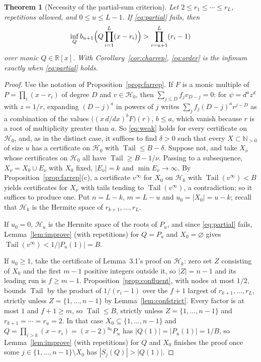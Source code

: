 \documentclass[11pt]{article}
\newtheorem{theorem}{Theorem}[section]
\theoremstyle{definition}
\theoremstyle{plain}
\newcommand{\R}{\mathbb R}
\newcommand{\N}{\mathbb N}
\DeclareMathOperator{\Tail}{Tail}
\begin{document}
\begin{theorem}[Necessity of the partial-sum criterion]\label{thm:converse}
Let $2\le r_1\le\cdots\le r_L$, repetitions allowed, and $0\le u\le L-1$.  If
\eqref{eq:partial} fails, then
\[
  \inf_Qb_{u+1}\Bigl(Q\prod_{i=1}^L(x-r_i)\Bigr)>\prod_{i=u+1}^L(r_i-1)
\]
over monic $Q\in\R[x]$.  With Corollary~\ref{cor:charrep},
\eqref{eq:order} is the infimum exactly when \eqref{eq:partial} holds.
\end{theorem}

\begin{proof}
Use the notation of Proposition~\ref{prop:farrep}.  If $F$ is a monic
multiple of $P=\prod_i(x-r_i)$ of degree $D$ and $v\in\mathcal H_0$, then
$\sum_{j\le D}f_jv_{D-j}=0$: for $\psi=d^az^d$ with $z=1/r$, expanding
$(D-j)^a$ in powers of $j$ writes $\sum_jf_j(D-j)^ar^{j-D}$ as a combination
of the values $\bigl((x\,d/dx)^bF\bigr)(r)$, $b\le a$, which vanish because
$r$ is a root of multiplicity greater than $a$.  So \eqref{eq:weak} holds
for every certificate on $\mathcal H_0$, and, as in the distinct case, it
suffices to find $\delta>0$ such that every $X\subset\N_{>0}$ of size $u$ has
a certificate on $\mathcal H_0$ with $\Tail\le B-\delta$.  Suppose not, and
take $X_\nu$ whose certificates on $\mathcal H_0$ all have
$\Tail\ge B-1/\nu$.  Passing to a subsequence, $X_\nu=X_0\cup E_\nu$ with
$X_0$ fixed, $|E_\nu|=k$ and $\min E_\nu\to\infty$.  By
Proposition~\ref{prop:farrep}(c), a certificate $v^\infty$ for $X_0$ on
$\mathcal H_k$ with $\Tail(v^\infty)<B$ yields certificates for $X_\nu$
with tails tending to $\Tail(v^\infty)$, a contradiction; so it suffices to
produce one.  Put
$n=L-k$, $m=L-u$ and $u_0=|X_0|=u-k$; recall that $\mathcal H_k$ is the
Hermite space of $r_{k+1},\ldots,r_L$.

If $u_0=0$, $\mathcal H_u$ is the Hermite space of the roots of $P_u$, and
since \eqref{eq:partial} fails, Lemma~\ref{lem:improve} (with repetitions)
for $Q=P_u$ and $X_0=\varnothing$ gives $\Tail(v^\infty)<1/|P_u(1)|=B$.

If $u_0\ge1$, take the certificate of Lemma~3.1's proof on $\mathcal H_k$:
zero set $Z$ consisting of $X_0$ and the first $m-1$ positive integers
outside it, so $|Z|=n-1$ and its leading run is $f\ge m-1$.
Proposition~\ref{prop:confluent}, with nodes at most $1/2$, bounds $\Tail$ by
the product of $1/(r_i-1)$ over the $f+1$ largest of $r_{k+1},\ldots,r_L$,
strictly unless $Z=\{1,\ldots,n-1\}$ by Lemma~\ref{lem:confstrict}.  Every
factor is at most $1$ and $f+1\ge m$, so $\Tail\le B$, strictly unless
$Z=\{1,\ldots,n-1\}$ and $r_{k+1}=\cdots=r_u=2$.  In that case
$X_0\subseteq\{1,\ldots,n-1\}$ and $Q=\prod_{i>k}(x-r_i)=(x-2)^{u_0}P_u$
has $|Q(1)|=|P_u(1)|=1/B$, so Lemma~\ref{lem:improve} (with repetitions) for
$Q$ and $X_0$ finishes the proof once some $j\in\{1,\ldots,n-1\}\setminus X_0$
has $|S_j(Q)|>|Q(1)|$.


\end{proof}
\end{document}

